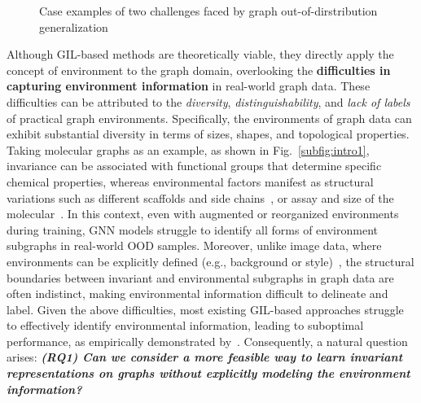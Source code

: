 \begin{figure}[t!]   

 \centering
\vspace{-5mm}
\caption{Case examples of two challenges faced by graph out-of-dirstribution generalization}
\vspace{-5mm}
\label{fig:moti}
\end{figure}
{Although GIL-based methods are theoretically viable, they directly apply the concept of environment to the graph domain,  overlooking the \textbf{difficulties in capturing environment information} in real-world graph data.} These difficulties can be attributed to the \textit{diversity}, \textit{distinguishability}, and \textit{lack of labels} of practical graph environments. 
Specifically, the environments of graph data can exhibit substantial diversity in terms of sizes, shapes, and topological properties. Taking molecular graphs as an example, as shown in Fig.~\ref{subfig:intro1}, invariance can be associated with functional groups that determine specific chemical properties, whereas environmental factors manifest as structural variations such as different scaffolds and side chains~\citep{zhuang2023learning}, or assay and size of the molecular~\citep{drugood}. In this context, even with augmented or reorganized environments during training, GNN models struggle to identify all forms of environment subgraphs in real-world OOD samples.  Moreover, unlike image data, where environments can be explicitly defined (e.g., background or style)~\citep{lin2022zin}, the structural boundaries between invariant and environmental subgraphs in graph data are often indistinct, making environmental information difficult to delineate and label. Given the above difficulties, most existing GIL-based approaches struggle to effectively identify environmental information, leading to suboptimal performance, as empirically demonstrated by~\citep{chen2024does}. Consequently, a natural question arises: \textbf{\textit{(RQ1) Can we consider a more feasible way to learn invariant representations on graphs without explicitly modeling the environment information?}}


